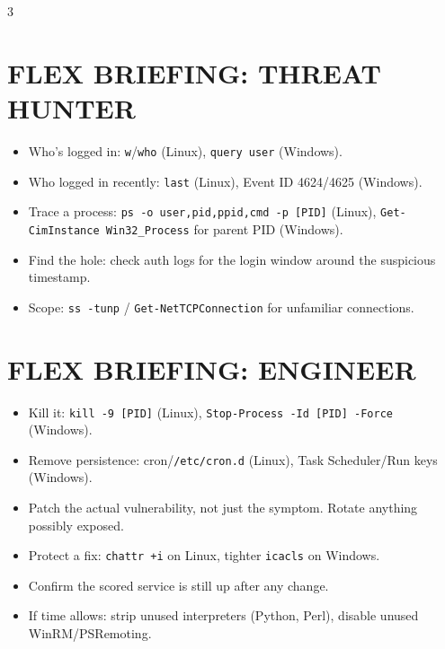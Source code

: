 \documentclass[7pt,landscape]{article}
\begin{document}
\begin{multicols*}{3}
\section{FLEX BRIEFING: THREAT HUNTER}
\begin{itemize}
    \item Who's logged in: \texttt{w}/\texttt{who} \textcolor{linuxc}{(Linux)}, \texttt{query user} \textcolor{winc}{(Windows)}.
    \item Who logged in recently: \texttt{last} \textcolor{linuxc}{(Linux)}, Event ID 4624/4625 \textcolor{winc}{(Windows)}.
    \item Trace a process: \texttt{ps -o user,pid,ppid,cmd -p [PID]} \textcolor{linuxc}{(Linux)}, \texttt{Get-CimInstance Win32\_Process} for parent PID \textcolor{winc}{(Windows)}.
    \item Find the hole: check auth logs for the login window around the suspicious timestamp.
    \item Scope: \texttt{ss -tunp} / \texttt{Get-NetTCPConnection} for unfamiliar connections.
\end{itemize}

\section{FLEX BRIEFING: ENGINEER}
\begin{itemize}
    \item Kill it: \texttt{kill -9 [PID]} \textcolor{linuxc}{(Linux)}, \texttt{Stop-Process -Id [PID] -Force} \textcolor{winc}{(Windows)}.
    \item Remove persistence: cron/\texttt{/etc/cron.d} \textcolor{linuxc}{(Linux)}, Task Scheduler/Run keys \textcolor{winc}{(Windows)}.
    \item Patch the actual vulnerability, not just the symptom. Rotate anything possibly exposed.
    \item Protect a fix: \texttt{chattr +i} on \textcolor{linuxc}{Linux}, tighter \texttt{icacls} on \textcolor{winc}{Windows}.
    \item Confirm the scored service is still up after any change.
    \item If time allows: strip unused interpreters (Python, Perl), disable unused WinRM/PSRemoting.
\end{itemize}


\end{multicols*}
\end{document}
